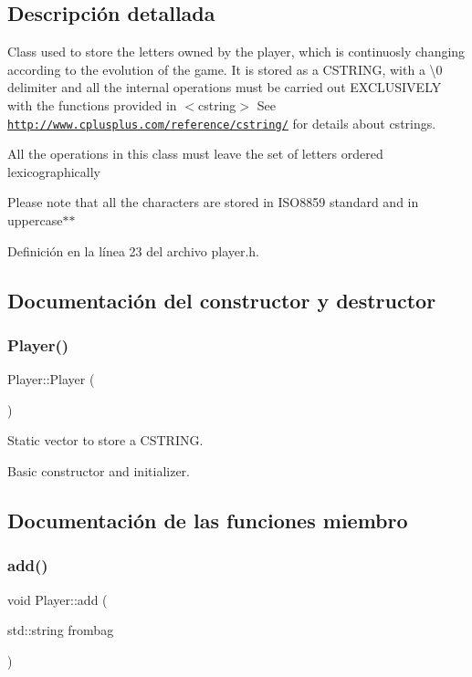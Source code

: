 \subsection{Descripción detallada}
Class used to store the letters owned by the player, which is continuosly changing according to the evolution of the game. It is stored as a C\+S\+T\+R\+I\+NG, with a \textbackslash{}0 delimiter and all the internal operations must be carried out E\+X\+C\+L\+U\+S\+I\+V\+E\+LY with the functions provided in $<$cstring$>$ See \href{http://www.cplusplus.com/reference/cstring/}{\tt http\+://www.\+cplusplus.\+com/reference/cstring/} for details about cstrings. 

All the operations in this class must leave the set of letters ordered lexicographically

Please note that all the characters are stored in I\+S\+O8859 standard and in uppercase$\ast$$\ast$ 

Definición en la línea 23 del archivo player.\+h.



\subsection{Documentación del constructor y destructor}
\mbox{\label{classPlayer_affe0cc3cb714f6deb4e62f0c0d3f1fd8}} 
\subsubsection{\texorpdfstring{Player()}{Player()}}
{\footnotesize\ttfamily Player\+::\+Player (\begin{DoxyParamCaption}{ }\end{DoxyParamCaption})}



Static vector to store a C\+S\+T\+R\+I\+NG. 

Basic constructor and initializer. 

\subsection{Documentación de las funciones miembro}
\mbox{\label{classPlayer_aeb62665ce6bda2e99c1b7b243b386211}} 
\subsubsection{\texorpdfstring{add()}{add()}}
{\footnotesize\ttfamily void Player\+::add (\begin{DoxyParamCaption}\item[{std\+::string}]{frombag }\end{DoxyParamCaption})}




